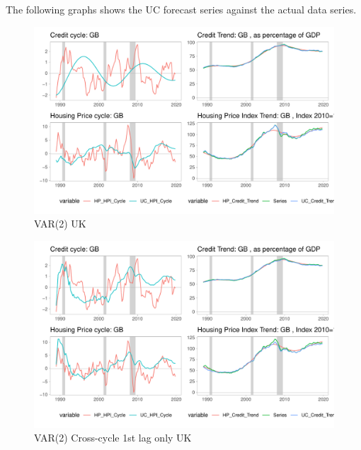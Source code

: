 \documentclass[
  12pt,
]{article}
\begin{document}
        
        The following graphs shows the UC forecast series against the actual data series.
        

\begin{figure}

{\centering \includegraphics[width=0.85\linewidth]{../../Regression/VAR_2/Output/Graphs/HP_Credit_4graphs_GB} 

}

\caption{VAR(2) UK}\label{fig:unnamed-chunk-1}
\end{figure}

\begin{figure}

{\centering \includegraphics[width=0.85\linewidth]{../../Regression/VAR_2_crosscycle_1stlagonly/Output/Graphs/HP_Credit_4graphs_GB} 

}

\caption{VAR(2) Cross-cycle 1st lag only UK}\label{fig:unnamed-chunk-2}
\end{figure}
\end{document}
